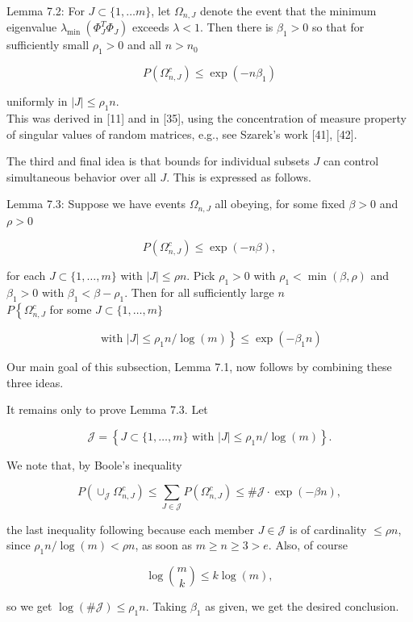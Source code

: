 \documentclass[10pt]{article}
\begin{document}
Lemma 7.2: For $J \subset\{1, \ldots m\}$, let $\Omega_{n, J}$ denote the event that the minimum eigenvalue $\lambda_{\text {min }}\left(\Phi_{J}^{T} \Phi_{J}\right)$ exceeds $\lambda<1$. Then there is $\beta_{1}>0$ so that for sufficiently small $\rho_{1}>0$ and all $n>n_{0}$

$$
P\left(\Omega_{n, J}^{c}\right) \leq \exp \left(-n \beta_{1}\right)
$$

uniformly in $|J| \leq \rho_{1} n$.\\[0pt]
This was derived in [11] and in [35], using the concentration of measure property of singular values of random matrices, e.g., see Szarek's work [41], [42].

The third and final idea is that bounds for individual subsets $J$ can control simultaneous behavior over all $J$. This is expressed as follows.

Lemma 7.3: Suppose we have events $\Omega_{n, J}$ all obeying, for some fixed $\beta>0$ and $\rho>0$

$$
P\left(\Omega_{n, J}^{c}\right) \leq \exp (-n \beta),
$$

for each $J \subset\{1, \ldots, m\}$ with $|J| \leq \rho n$. Pick $\rho_{1}>0$ with $\rho_{1}<\min (\beta, \rho)$ and $\beta_{1}>0$ with $\beta_{1}<\beta-\rho_{1}$. Then for all sufficiently large $n$\\
$P\left\{\Omega_{n, J}^{c}\right.$ for some $J \subset\{1, \ldots, m\}$

$$
\text { with } \left.|J| \leq \rho_{1} n / \log (m)\right\} \leq \exp \left(-\beta_{1} n\right)
$$

Our main goal of this subsection, Lemma 7.1, now follows by combining these three ideas.

It remains only to prove Lemma 7.3. Let

$$
\mathcal{J}=\left\{J \subset\{1, \ldots, m\} \text { with }|J| \leq \rho_{1} n / \log (m)\right\} .
$$

We note that, by Boole's inequality

$$
P\left(\cup_{\mathcal{J}} \Omega_{n, J}^{c}\right) \leq \sum_{J \in \mathcal{J}} P\left(\Omega_{n, J}^{c}\right) \leq \# \mathcal{J} \cdot \exp (-\beta n),
$$

the last inequality following because each member $J \in \mathcal{J}$ is of cardinality $\leq \rho n$, since $\rho_{1} n / \log (m)<\rho n$, as soon as $m \geq n \geq 3>e$. Also, of course

$$
\log \binom{m}{k} \leq k \log (m),
$$

so we get $\log (\# \mathcal{J}) \leq \rho_{1} n$. Taking $\beta_{1}$ as given, we get the desired conclusion.
\end{document}
